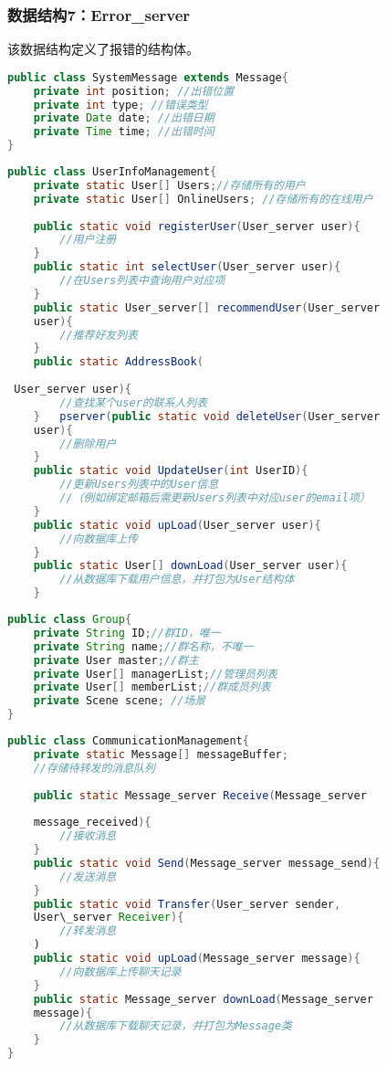 \subsubsection{数据结构7：Error\_server}
该数据结构定义了报错的结构体。
\begin{lstlisting}[language=Java, caption=Error定义]
public class SystemMessage extends Message{
    private int position; //出错位置
    private int type; //错误类型
    private Date date; //出错日期
    private Time time; //出错时间
}
\end{lstlisting}


\begin{lstlisting}[language=Java, caption=用户信息管理类]
public class UserInfoManagement{
    private static User[] Users;//存储所有的用户
    private static User[] OnlineUsers; //存储所有的在线用户
    
    public static void registerUser(User_server user){
        //用户注册
    }
    public static int selectUser(User_server user){
        //在Users列表中查询用户对应项
    }
    public static User_server[] recommendUser(User_server
    user){
        //推荐好友列表
    }
    public static AddressBook(
    
 User_server user){
        //查找某个user的联系人列表
    }   pserver(public static void deleteUser(User_server 
    user){
        //删除用户
    }
    public static void UpdateUser(int UserID){
        //更新Users列表中的User信息
        //（例如绑定邮箱后需更新Users列表中对应user的email项）
    }
    public static void upLoad(User_server user){
        //向数据库上传
    }
    public static User[] downLoad(User_server user){
        //从数据库下载用户信息，并打包为User结构体
    }
\end{lstlisting}

\begin{lstlisting}[language=Java, caption=Group定义]
public class Group{
    private String ID;//群ID，唯一
    private String name;//群名称，不唯一
    private User master;//群主
    private User[] managerList;//管理员列表
    private User[] memberList;//群成员列表
    private Scene scene; //场景
}
\end{lstlisting}

\begin{lstlisting}[language=Java, caption=通讯管理类]
public class CommunicationManagement{
    private static Message[] messageBuffer; 
    //存储待转发的消息队列
    
    public static Message_server Receive(Message_server
    
    message_received){
        //接收消息
    }
    public static void Send(Message_server message_send){
        //发送消息
    }
    public static void Transfer(User_server sender, 
    User\_server Receiver){
        //转发消息
    )
    public static void upLoad(Message_server message){
        //向数据库上传聊天记录
    }
    public static Message_server downLoad(Message_server 
    message){
        //从数据库下载聊天记录，并打包为Message类
    }
}
\end{lstlisting}

